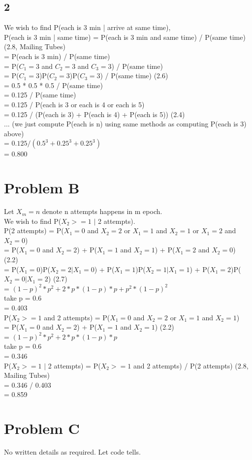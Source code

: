 \documentclass{article}
\begin{document}
\subsection{2}
We wish to find P(each is 3 min | arrive at same time),\\
P(each is 3 min | same time) = P(each is 3 min and same time) / P(same time) (2.8, Mailing Tubes)\\
= P(each is 3 min) / P(same time)\\
= P($C_{1}=3$ and $C_{2}=3$ and $C_{3}=3$) / P(same time)\\
= P($C_{1}=3$)P($C_{2}=3$)P($C_{3}=3$) / P(same time) (2.6)\\
= 0.5 * 0.5 * 0.5 / P(same time)\\
= 0.125 / P(same time)\\
= 0.125 / P(each is 3 or each is 4 or each is 5)\\
= 0.125 / (P(each is 3) + P(each is 4) + P(each is 5)) (2.4)\\
... (we just compute P(each is n) using same methods as computing P(each is 3) above)\\
= $0.125 / (0.5 ^ 3 + 0.25 ^ 3 + 0.25 ^ 3)$\\
= 0.800\\

\section{Problem B}
Let $X_{m}=n$ denote n attempts happens in m epoch.\\
We wish to find P($X_{2}>=1$ $|$ 2 attempts).\\

P(2 attempts) = P($X_{1}=0$ and $X_{2}=2$ or $X_{1}=1$ and $X_{2}=1$ or $X_{1}=2$ and $X_{2}=0$)\\
= P($X_{1}=0$ and $X_{2}=2$) + P($X_{1}=1$ and $X_{2}=1$) + P($X_{1}=2$ and $X_{2}=0$) (2.2)\\
= P($X_{1}=0$)P($X_{2}=2|X_{1}=0$) + P($X_{1}=1$)P($X_{2}=1|X_{1}=1$) + P($X_{1}=2$)P($X_{2}=0|X_{1}=2$) (2.7)\\
= $(1-p)^2*p^2 + 2*p*(1-p)*p + p^2*(1-p)^2$\\
take p = 0.6\\
= 0.403\\

P($X_{2}>=1$ and 2 attempts) = P($X_{1}=0$ and $X_{2}=2$ or $X_{1}=1$ and $X_{2}=1$)\\
= P($X_{1}=0$ and $X_{2}=2$) + P($X_{1}=1$ and $X_{2}=1$) (2.2)\\
= $(1-p)^2*p^2+2*p*(1-p)*p$\\
take p = 0.6\\
= 0.346\\

P($X_{2}>=1$ $|$ 2 attempts) = P($X_{2}>=1$ and 2 attempts) / P(2 attempts) (2.8, Mailing Tubes)\\
= 0.346 / 0.403\\
= 0.859\\

\section{Problem C}
No written details as required. Let code tells.
\end{document}
